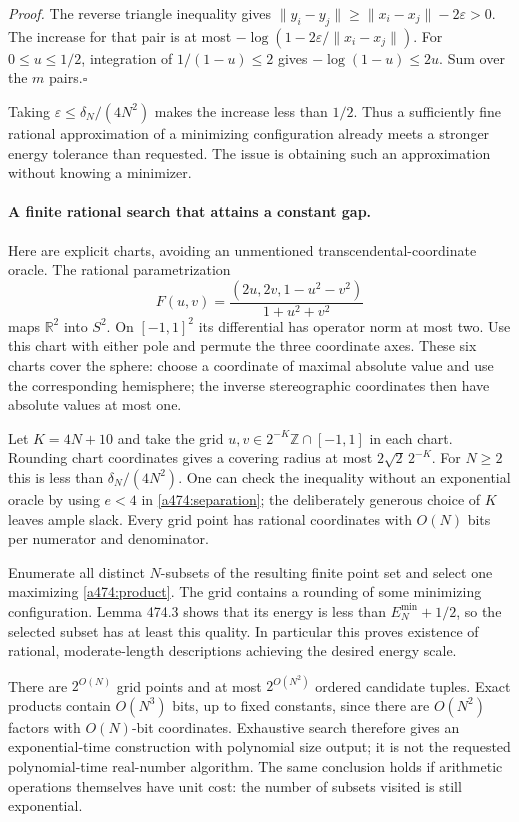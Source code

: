 \documentclass[11pt]{article}
\begin{document}
\emph{Proof.} The reverse triangle inequality gives
$\|y_i-y_j\|\ge\|x_i-x_j\|-2\varepsilon>0$.
The increase for that pair is at most
$-\log(1-2\varepsilon/\|x_i-x_j\|)$.
For $0\le u\le1/2$, integration of $1/(1-u)\le2$ gives
$-\log(1-u)\le2u$. Sum over the $m$ pairs.\hfill$\square$

Taking $\varepsilon\le\delta_N/(4N^2)$ makes the increase less than
$1/2$. Thus a sufficiently fine rational approximation of a minimizing
configuration already meets a stronger energy tolerance than requested.
The issue is obtaining such an approximation without knowing a minimizer.

\paragraph{A finite rational search that attains a constant gap.}
Here are explicit charts, avoiding an unmentioned transcendental-coordinate
oracle. The rational parametrization
\[
 F(u,v)=\frac{(2u,2v,1-u^2-v^2)}{1+u^2+v^2}
\]
maps $\mathbb R^2$ into $S^2$. On $[-1,1]^2$ its differential has
operator norm at most two. Use this chart with either pole and permute
the three coordinate axes. These six charts cover the sphere: choose a
coordinate of maximal absolute value and use the corresponding hemisphere;
the inverse stereographic coordinates then have absolute values at most one.

Let $K=4N+10$ and take the grid $u,v\in2^{-K}\mathbb Z\cap[-1,1]$ in
each chart. Rounding chart coordinates gives a covering radius at most
$2\sqrt2\,2^{-K}$. For $N\ge2$ this is less than
$\delta_N/(4N^2)$. One can check the inequality without an exponential
oracle by using $e<4$ in \eqref{a474:separation}; the deliberately generous
choice of $K$ leaves ample slack. Every grid point has rational coordinates
with $O(N)$ bits per numerator and denominator.

Enumerate all distinct $N$-subsets of the resulting finite point set and
select one maximizing \eqref{a474:product}. The grid contains a rounding
of some minimizing configuration. Lemma 474.3 shows that its energy is
less than $E_N^{\min}+1/2$, so the selected subset has at least this
quality. In particular this proves existence of rational, moderate-length
descriptions achieving the desired energy scale.

There are $2^{O(N)}$ grid points and at most $2^{O(N^2)}$ ordered candidate
tuples. Exact products contain $O(N^3)$ bits, up to fixed constants,
since there are $O(N^2)$ factors with $O(N)$-bit coordinates. Exhaustive
search therefore gives an exponential-time construction with polynomial
size output; it is not the requested polynomial-time real-number algorithm.
The same conclusion holds if arithmetic operations themselves have unit
cost: the number of subsets visited is still exponential.
\end{document}
